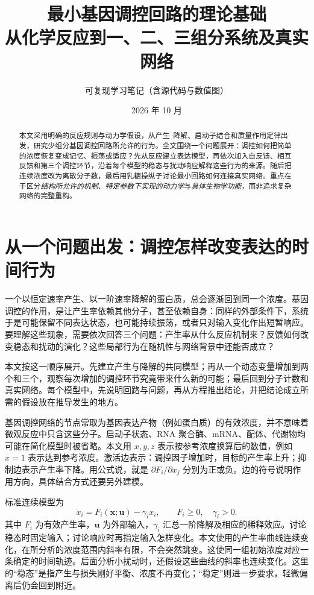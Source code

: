 \documentclass[11pt,a4paper,UTF8,fontset=fandol]{ctexart}
\title{\bfseries 最小基因调控回路的理论基础\\[4pt]\large 从化学反应到一、二、三组分系统及真实网络}
\author{可复现学习笔记（含源代码与数值图）}
\date{2026 年 10 月}
\begin{document}
\maketitle
\begin{abstract}
本文采用明确的反应规则与动力学假设，从产生--降解、启动子结合和质量作用定律出发，研究少组分基因调控回路所允许的行为。全文围绕一个问题展开：调控如何把简单的浓度恢复变成记忆、振荡或适应？先从反应建立表达模型，再依次加入自反馈、相互反馈和第三个调控环节，沿着每个模型的稳态与扰动响应解释这些行为的来源。随后把连续浓度改为离散分子数，最后用乳糖操纵子讨论最小回路如何连接真实网络。重点在于区分\emph{结构所允许的机制}、\emph{特定参数下实现的动力学}与\emph{具体生物学功能}，而非追求复杂网络的完整重构。
\end{abstract}
\newpage{\small\setlength{\parskip}{0pt}\tableofcontents}\newpage
\section{从一个问题出发：调控怎样改变表达的时间行为}
一个以恒定速率产生、以一阶速率降解的蛋白质，总会逐渐回到同一个浓度。基因调控的作用，是让产生率依赖其他分子，甚至依赖自身：同样的外部条件下，系统于是可能保留不同表达状态，也可能持续振荡，或者只对输入变化作出短暂响应。要理解这些现象，需要依次回答三个问题：产生率从什么反应机制来？反馈如何改变稳态和扰动的演化？这些局部行为在随机性与网络背景中还能否成立？

本文按这一顺序展开。先建立产生与降解的共同模型；再从一个动态变量增加到两个和三个，观察每次增加的调控环节究竟带来什么新的可能；最后回到分子计数和真实网络。每个模型中，先说明回路与问题，再从方程推出结论，并把结论成立所需的假设放在推导发生的地方。

基因调控网络的节点常取为基因表达产物（例如蛋白质）的有效浓度，并不意味着微观反应中只含这些分子。启动子状态、RNA 聚合酶、mRNA、配体、代谢物均可能在简化模型时被省略。本文用 $x,y,z$ 表示按参考浓度换算后的数值，例如 $x=1$ 表示达到参考浓度。激活边表示：调控因子增加时，目标的产生率上升；抑制边表示产生率下降。用公式说，就是 $\partial F_i/\partial x_j$ 分别为正或负。边的符号说明作用方向，具体结合方式还要另外建模。

标准连续模型为
\begin{equation}\dot x_i=F_i(\bm{x};\bm{u})-\gamma_i x_i,\qquad F_i\geq0,\quad\gamma_i>0.\end{equation}
其中 $F_i$ 为有效产生率，$\bm u$ 为外部输入，$\gamma_i$ 汇总一阶降解及相应的稀释效应。讨论稳态时固定输入；讨论响应时再指定输入怎样变化。本文使用的产生率曲线连续变化，在所分析的浓度范围内斜率有限，不会突然跳变。这使同一组初始浓度对应一条确定的时间轨迹。后面分析小扰动时，还假设这些曲线的斜率也连续变化。这里的“稳态”是指产生与损失刚好平衡、浓度不再变化；“稳定”则进一步要求，轻微偏离后仍会回到附近。
\end{document}
